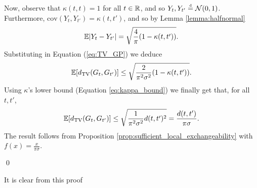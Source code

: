 Now, observe that $\kappa(t, t) = 1$ for all $t \in \mathbb{R}$, and so $Y_t, Y_{t'} \stackrel{\text{\rm\tiny d}}{=} \mathcal{N}(0, 1)$. Furthermore, $\mathrm{cov}(Y_t, Y_{t'}) = \kappa(t, t')$, and so by Lemma \ref{lemma:halfnormal}
\begin{equation*}
	\mathbb{E} |Y_t - Y_{t'}| = \sqrt{\frac{4}{\pi}(1 - \kappa(t, t'))}.
\end{equation*}
Substituting in Equation (\ref{eq:TV_GP}) we deduce
\begin{equation} \label{eq:TV_GP_2}
	\mathbb{E} [d_{\mathrm{TV}} (G_t , G_{t'} )] \leq \sqrt{\frac{2}{\pi^2 \sigma^2}(1 - \kappa(t, t'))}.
\end{equation}
Using $\kappa$'s lower bound (Equation \ref{eq:kappa_bound}) we finally get that, for all $t, t'$,
\begin{equation}
	\mathbb{E} [d_{\mathrm{TV}} (G_t , G_{t'} )] \leq \sqrt{\frac{1}{\pi^2 \sigma^2}d(t, t')^2} = \frac{d(t, t')}{\pi \sigma}.
\end{equation}
The result follows from Proposition \ref{prop:sufficient_local_exchangeability} with $f(x) = \frac{x}{\pi \sigma}$.

\qed


\vskip 0.2cm

It is clear from this proof 



